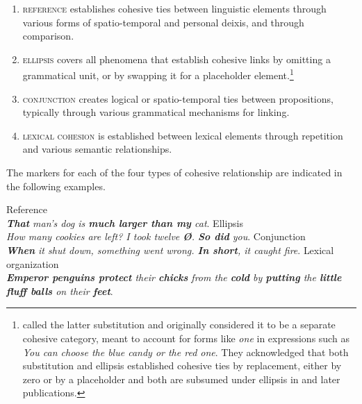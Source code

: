 \documentclass[output=paper
,modfonts
,nonflat]{langsci/langscibook}
\begin{document}
\begin{enumerate}
		\item \textsc{reference} establishes cohesive ties between linguistic elements through various forms of spatio-temporal and personal deixis, and through comparison. 
		\item \textsc{ellipsis} covers all phenomena that establish cohesive links by omitting a grammatical unit, or by swapping it for a placeholder element.\footnote{ \citet[88--141]{Halliday1976} called the latter substitution and originally considered it to be a separate cohesive category, meant to account for forms like \textit{one} in  expressions such as \textit{You can choose the blue candy or the red one}. They acknowledged that both substitution and ellipsis established cohesive ties by replacement, either by zero or by a placeholder \citep[88]{Halliday1976} and both are subsumed under ellipsis in \citet{Halliday1994} and later publications.} 
		\item \textsc{conjunction} creates logical or spatio-temporal ties between propositions, typically through various grammatical mechanisms for  linking. 
		\item \textsc{lexical cohesion} is established between lexical elements through repetition and various semantic relationships.
\end{enumerate}

\noindent
The markers for each of the four types of cohesive relationship are indicated in the following examples.

\begin{exe}
	\ex\label{e1}
	\begin{xlist}
		\ex\label{e1a} Reference\\
		\textit{\textbf{That} man’s dog is \textbf{much larger than my} cat}.
		\ex\label{e1b} Ellipsis\\
		\textit{How many cookies are left? I took twelve \textbf{Ø}. \textbf{So did} you}.
		\ex\label{e1c} Conjunction\\
		\textit{\textbf{When} it shut down, something went wrong. \textbf{In short}, it caught fire}.
		\ex\label{e1d} Lexical organization\\
		\textit{\textbf{Emperor penguins protect} their \textbf{chicks} from the \textbf{cold} by \textbf{putting} the \textbf{little} \textbf{fluff balls} on their \textbf{feet}}.
	\end{xlist}
\end{exe}
\end{document}
